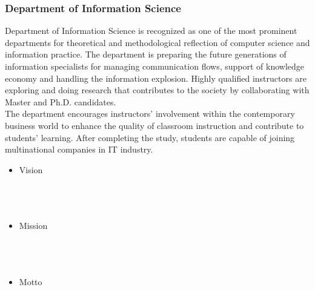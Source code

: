 \documentclass[conference]{IEEEtran}
\begin{document}
\subsubsection{Department of Information Science}
Department of Information Science is recognized as one of the most prominent departments for theoretical and methodological reflection of computer science and information practice. The department is preparing the future generations of information specialists for managing communication flows, support of knowledge economy and handling the information explosion. Highly qualified instructors are exploring and doing research that contributes to the society by collaborating with Master and Ph.D. candidates.\\
The department encourages instructors’ involvement within the contemporary business world to enhance the quality of classroom instruction and contribute to students’ learning. After completing the study, students are capable of joining multinational companies in IT industry.
\\
\begin{itemize}
\item Vision\\ \\
\noindent{}
\\ \\
\item Mission\\ \\
\noindent{}
\\ \\
\item Motto\\ \\
\noindent{}
\end{itemize}
\end{document}
